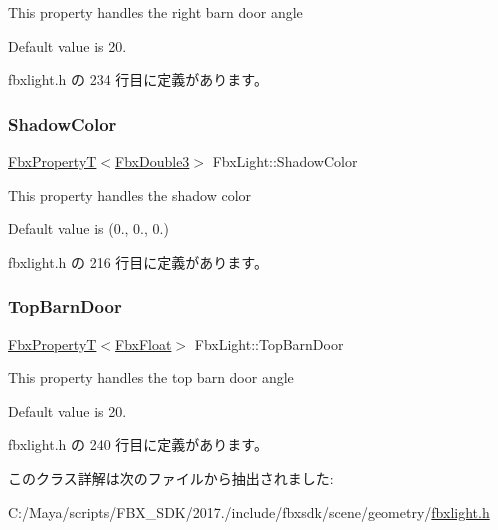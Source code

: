This property handles the right barn door angle

Default value is 20. 

 fbxlight.\+h の 234 行目に定義があります。

\mbox{\label{class_fbx_light_aeb8d7f6d6fa57f4dc86ff8e47ff61dbf}} 
\subsubsection{\texorpdfstring{Shadow\+Color}{ShadowColor}}
{\footnotesize\ttfamily \hyperlink{class_fbx_property_t}{Fbx\+PropertyT}$<$\hyperlink{fbxtypes_8h_ae0a96f14cde566774c7553aa7523b7a7}{Fbx\+Double3}$>$ Fbx\+Light\+::\+Shadow\+Color}

This property handles the shadow color

Default value is (0., 0., 0.) 

 fbxlight.\+h の 216 行目に定義があります。

\mbox{\label{class_fbx_light_a22b02c12b00c38da4d38a21876ec5340}} 
\subsubsection{\texorpdfstring{Top\+Barn\+Door}{TopBarnDoor}}
{\footnotesize\ttfamily \hyperlink{class_fbx_property_t}{Fbx\+PropertyT}$<$\hyperlink{fbxtypes_8h_aef968e37f2ddc4188de464d8578c1d5c}{Fbx\+Float}$>$ Fbx\+Light\+::\+Top\+Barn\+Door}

This property handles the top barn door angle

Default value is 20. 

 fbxlight.\+h の 240 行目に定義があります。



このクラス詳解は次のファイルから抽出されました\+:\begin{DoxyCompactItemize}
\item 
C\+:/\+Maya/scripts/\+F\+B\+X\+\_\+\+S\+D\+K/2017./include/fbxsdk/scene/geometry/\hyperlink{fbxlight_8h}{fbxlight.\+h}\end{DoxyCompactItemize}
